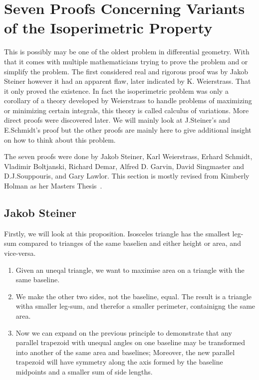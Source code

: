 \documentclass[a4paper]{book}
\numberwithin{theorem}{section}%
\begin{document}
\section{Seven Proofs Concerning Variants of the Isoperimetric Property}
This is possibly may be one of the oldest problem in differential geometry. With that it comes with multiple mathematicians trying to prove the problem and or simplify the problem. The first considered real and rigorous proof was by Jakob Steiner however it had an apparent flaw, later indicated by K. Weierstrass. That it only proved the existence. In fact the isoperimetric problem was only a corollary of a theory developed by Weierstrass to handle problems of maximizing or minimizing certain integrals, this theory is called calculus of variations. More direct proofs were discovered later. We will mainly look at J.Steiner's and E.Schmidt's proof but the other proofs are mainly here to give additional insight on how to think about this problem. 

The seven proofs were done by Jakob Steiner, Karl Weierstrass, Erhard Schmidt, Vladimir Boltjanski, Richard Demar, Alfred D. Garvin, David Singmaster and D.J.Souppouris, and Gary Lawlor. This section is mostly revised from Kimberly Holman as her Masters Thesis~\citep{holman2022isoperimetric}.

\subsection{Jakob Steiner}
Firstly, we will look at this proposition. Isosceles triangle has the smallest leg-sum compared to trianges of the same baselien and either height or area, and vice-versa. 

\begin{enumerate}
    \item Given an uneqal triangle, we want to maximise area on a triangle with the same baseline. 

    \item We make the other two sides, not the baseline, equal. The result is a triangle witha smaller leg-sum, and therefor a smaller perimeter, containigng the same area.

    \item Now we can expand on the previous principle to demonstrate that any parallel trapezoid with unequal angles on one baseline may be transformed into another of the same area and baselines; Moreover, the new parallel trapezoid will have symmetry along the axis formed by the baseline midpoints and a smaller sum of side lengths. 
\end{enumerate}
\end{document}
